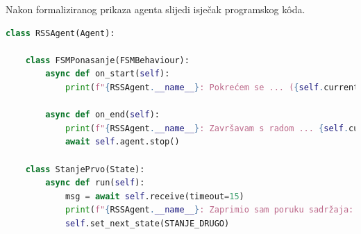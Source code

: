 \documentclass[]{foi} %
\begin{document}
Nakon formaliziranog prikaza agenta slijedi isječak programskog kôda.
\begin{lstlisting}[language=Python, caption={Programski kôd za RSSAgent agenta}]
class RSSAgent(Agent):

    class FSMPonasanje(FSMBehaviour):
        async def on_start(self):
            print(f"{RSSAgent.__name__}: Pokrećem se ... ({self.current_state})")

        async def on_end(self):
            print(f"{RSSAgent.__name__}: Završavam s radom ... {self.current_state}")
            await self.agent.stop()

    class StanjePrvo(State):
        async def run(self):
            msg = await self.receive(timeout=15)
            print(f"{RSSAgent.__name__}: Zaprimio sam poruku sadržaja: \"{msg.body}\"")
            self.set_next_state(STANJE_DRUGO)


\end{lstlisting}
\end{document}
